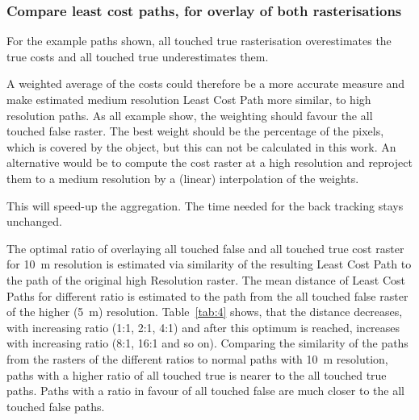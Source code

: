 \subsubsection{Compare least cost paths, for overlay of both rasterisations}

For the example paths shown, all touched true rasterisation overestimates the true costs and all touched true underestimates them.

A weighted average of the costs could therefore be a more accurate measure and make estimated medium resolution Least Cost Path more similar, to high resolution paths.
As all example show, the weighting should favour the all touched false raster.
The best weight should be the percentage of the pixels, which is covered by the object, but this can not be calculated in this work.
An alternative would be to compute the cost raster at a high resolution and reproject them to a medium resolution by a (linear) interpolation of the weights.

This will speed-up the aggregation.
The time needed for the back tracking stays unchanged.

The optimal ratio of overlaying all touched false and all touched true cost raster for 10~m resolution is estimated via similarity of the resulting Least Cost Path to the path of the original high Resolution raster. 
The mean distance of Least Cost Paths for different ratio is estimated to the path from the all touched false raster of the higher (5~m) resolution. 
Table~\ref{tab:4} shows, that the distance decreases, with increasing ratio (1:1, 2:1, 4:1) and after this optimum is reached, increases with increasing ratio (8:1, 16:1 and so on).
Comparing  the similarity of the paths from the rasters of the different ratios to normal paths with 10~m resolution, paths with a higher ratio of all touched true is nearer to the all touched true paths.
Paths with a ratio in favour of all touched false are much closer to the all touched false paths.


